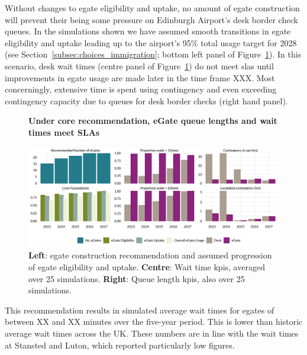 \documentclass[10pt]{article}
\newcommand*{\figuretitle}[1]{%
    {\centering%
    \textbf{#1}%
    \par\medskip}%
}
\begin{document}
Without changes to \gls{egate} eligibility and uptake, no amount of \gls{egate} construction will prevent their being some pressure on Edinburgh Airport's desk border check queues. In the simulations shown we have assumed smooth transitions in \gls{egate} eligibility and uptake leading up to the airport's 95\% total usage target for 2028 (see Section~\ref{subsec:choices_immigration}; bottom left panel of Figure~\ref{fig:core_rec_fig}). In this scenario, desk wait times (centre panel of Figure~\ref{fig:core_rec_fig}) do not meet \glspl{sla} until improvements in \gls{egate} usage are made later in the time frame XXX. Most concerningly, extensive time is spent using contingency and even exceeding contingency capacity due to queues for desk border checks (right hand panel). 

\begin{figure}[!ht]
    \centering
    \figuretitle{Under core recommendation, eGate queue lengths and wait times meet SLAs}
    \includegraphics[width=\textwidth]{figures/core_rec_fig.png}
     \caption{\textbf{Left}: \gls{egate} construction recommendation and assumed progression of \gls{egate} eligibility and uptake. \textbf{Centre}: Wait time \glspl{kpi}, averaged over 25 simulations. \textbf{Right}: Queue length \glspl{kpi}, also over 25 simulations.} \label{fig:core_rec_fig}
\end{figure}

This recommendation results in simulated average wait times for \glspl{egate} of between XX and XX minutes over the five-year period. This is lower than historic average wait times across the UK. These numbers are in line with the wait times at Stansted and Luton, which reported particularly low figures. 

\end{document}
